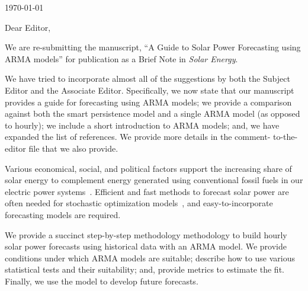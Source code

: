 \documentclass[11pt]{article} %
\begin{document}






\today
\par
Dear Editor,
\par
We are re-submitting the manuscript, ``A Guide to Solar Power Forecasting using 
ARMA models'' for publication as a Brief Note in \textit{Solar Energy}.
\par
We have tried to incorporate almost all of the suggestions by both the 
Subject Editor and the Associate Editor. Specifically, we now state that our 
manuscript provides a guide for forecasting using ARMA models; we provide a 
comparison against both the smart persistence model and a single ARMA model (as 
opposed to hourly); we include a short introduction to ARMA models; and, we have 
expanded the list of references. We provide more details in the comment- 
to-the-editor file that we also provide.
\par
Various economical, social, and political factors support the increasing share 
of solar energy to complement energy generated using conventional fossil fuels 
in our electric power systems~\cite{stoddard2006economic}. Efficient and 
fast methods to forecast solar power are often needed for stochastic 
optimization models~\cite{su2014stochastic}, and easy-to-incorporate 
forecasting models are required.
\par
We provide a succinct step-by-step methodology methodology to build hourly 
solar power forecasts using historical data with an ARMA model. We provide 
conditions under which ARMA models are suitable; describe how to use 
various statistical tests and their suitability; and, provide metrics 
to estimate the fit. Finally, we use the model to develop future 
forecasts.
\end{document}
